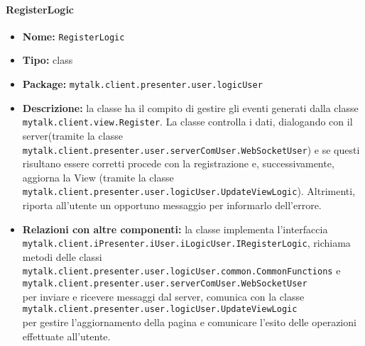 \paragraph{RegisterLogic}{
	\begin{itemize}
		\item [] \textbf{Nome:} \texttt{RegisterLogic}
		\item [] \textbf{Tipo:} class
		\item [] \textbf{Package:} \texttt{mytalk.client.presenter.user.logicUser}
		\item [] \textbf{Descrizione:} la classe ha il compito di gestire gli eventi generati dalla classe \texttt{mytalk.client.view.Register}. La classe controlla i dati, dialogando con il server\g (tramite la classe \\ \texttt{mytalk.client.presenter.user.serverComUser.WebSocketUser}) e se questi risultano essere corretti procede con la registrazione e, successivamente, aggiorna la View (tramite la classe \texttt{mytalk.client.presenter.user.logicUser.UpdateViewLogic}). Altrimenti, riporta all'utente un opportuno messaggio per informarlo dell'errore.
		\item [] \textbf{Relazioni con altre componenti:} la classe implementa l'interfaccia\\ \texttt{mytalk.client.iPresenter.iUser.iLogicUser.IRegisterLogic}, richiama metodi delle classi \\ \texttt{mytalk.client.presenter.user.logicUser.common.CommonFunctions} e \\ \texttt{mytalk.client.presenter.user.serverComUser.WebSocketUser}\\ per inviare e ricevere messaggi dal server\g, comunica con la classe\\ \texttt{mytalk.client.presenter.user.logicUser.UpdateViewLogic}\\ per gestire l'aggiornamento della pagina e comunicare l'esito delle operazioni effettuate all'utente.
	\end{itemize}
}
